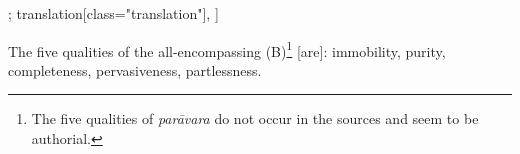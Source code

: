 \begin{alignment}[
  texts=edition[class="edition"];
  translation[class="translation"],
  ]
\begin{translation}
\begin{tlate}[p48_02]
     \indent
     The five qualities of the all-encompassing (B)\footnote{The five qualities of \textit{parāvara} do not occur in the sources and seem to be authorial.} [are]: immobility, purity, completeness, pervasiveness, partlessness.
     \flushpage
    \end{tlate}
  \end{translation}
\end{alignment}
\pagebreak %
